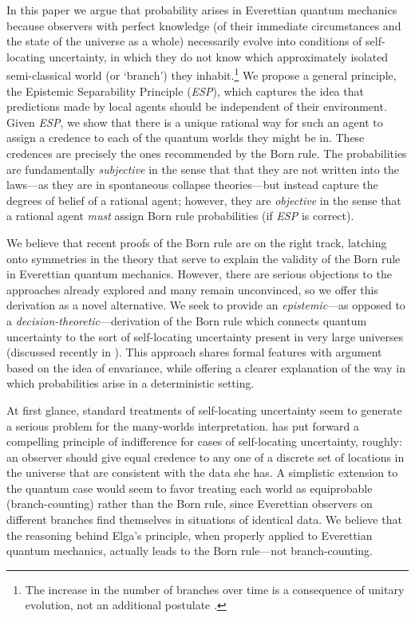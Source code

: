 \documentclass[onecolumn,secnumarabic,amsmath,amssymb,balancelastpage,nofootinbib]{article}
\begin{document}
In this paper we argue that probability arises in Everettian quantum mechanics because observers with perfect knowledge (of their immediate circumstances and the state of the universe as a whole) necessarily evolve into conditions of self-locating uncertainty, in which they do not know which approximately isolated semi-classical world (or `branch') they inhabit.\footnote{The increase in the number of branches over time is a consequence of unitary evolution, not an additional postulate \citep{wallace2003, wallace2010c}.}  We propose a general principle, the Epistemic Separability Principle (\emph{ESP}), which captures the idea that predictions made by local agents should be independent of their environment. Given \emph{ESP}, we show that there is a unique rational way for such an agent to assign a credence to each of the quantum worlds they might be in.  These credences are precisely the ones recommended by the Born rule.  The probabilities are fundamentally \emph{subjective} in the sense that that they are not written into the laws---as they are in spontaneous collapse theories---but instead capture the degrees of belief of a rational agent; however, they are \emph{objective} in the sense that a rational agent  \emph{must} assign Born rule probabilities (if \emph{ESP} is correct).

We believe that recent proofs of the Born rule \citep{deutsch1999, wallace2010b, zurek2005} are on the right track, latching onto symmetries in the theory that serve to explain the validity of the Born rule in Everettian quantum mechanics.  However, there are serious objections to the approaches already explored and many remain unconvinced, so we offer this derivation as a novel alternative.  We seek to provide an \emph{epistemic}---as opposed to a \emph{decision-theoretic}---derivation of the Born rule which connects quantum uncertainty to the sort of self-locating uncertainty present in very large universes (discussed recently in \citealp{hartle2007, page2007, srednicki2010}). This approach shares formal features with  \citeyearpar{zurek2003,zurek2003b,zurek2005} argument based on the idea of envariance, while offering a clearer explanation of the way in which probabilities arise in a deterministic setting.
 
At first glance, standard treatments of self-locating uncertainty seem to generate a serious problem for the many-worlds interpretation.  \citet{elga2004} has put forward a compelling principle of indifference for cases of self-locating uncertainty, roughly: an observer should give equal credence to any one of a discrete set of locations in the universe that are consistent with the data she has. A simplistic extension to the quantum case would seem to favor treating each world as equiprobable (branch-counting) rather than the Born rule, since Everettian observers on different branches find themselves in situations of identical data. We believe that the reasoning behind Elga's principle, when properly applied to Everettian quantum mechanics, actually leads to the Born rule---not branch-counting.  
\end{document}
